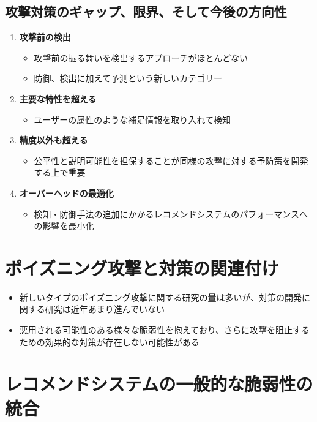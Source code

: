 \documentclass[11pt,a4paper]{article}
\begin{document}
\subsection{攻撃対策のギャップ、限界、そして今後の方向性}
\begin{enumerate}
    \item \textbf{攻撃前の検出}
    \begin{itemize}
        \item 攻撃前の振る舞いを検出するアプローチがほとんどない
        \item 防御、検出に加えて予測という新しいカテゴリー
    \end{itemize}
    
    \item \textbf{主要な特性を超える}
    \begin{itemize}
        \item ユーザーの属性のような補足情報を取り入れて検知
    \end{itemize}
    
    \item \textbf{精度以外も超える}
    \begin{itemize}
        \item 公平性と説明可能性を担保することが同様の攻撃に対する予防策を開発する上で重要
    \end{itemize}
    
    \item \textbf{オーバーヘッドの最適化}
    \begin{itemize}
        \item 検知・防御手法の追加にかかるレコメンドシステムのパフォーマンスへの影響を最小化
    \end{itemize}
\end{enumerate}

\section{ポイズニング攻撃と対策の関連付け}

\begin{itemize}
    \item 新しいタイプのポイズニング攻撃に関する研究の量は多いが、対策の開発に関する研究は近年あまり進んでいない
    \item 悪用される可能性のある様々な脆弱性を抱えており、さらに攻撃を阻止するための効果的な対策が存在しない可能性がある
\end{itemize}

\section{レコメンドシステムの一般的な脆弱性の統合}
\end{document}
